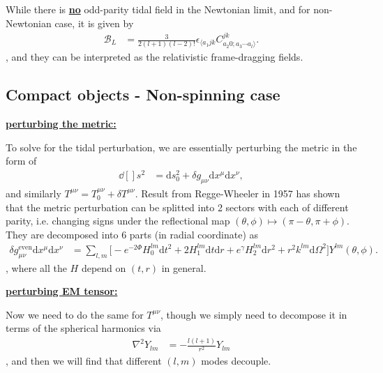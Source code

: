 \documentclass[a4paper, 12pt]{article}
\begin{document}
      While there is \underline{\textbf{no}} odd-parity tidal field
      in the Newtonian limit, and for non-Newtonian case, it is given by 
      \begin{align}
        \label{odd parity tidal}
        \mathcal{B}_L &= \frac{3}{2(l+1)(l-2)!} \epsilon_{\langle
        a_1 j k} C_{a_2 0; a_3\cdots a_l \rangle }^{jk}.
      \end{align}, and they can be interpreted as the relativistic
      frame-dragging fields.
      \subsection{Compact objects - Non-spinning case}%
        \label{sub:Compact objects - Non-spinning case}
       
\textbf{\underline{perturbing the metric: }}

       To solve for the tidal perturbation, we are essentially
       perturbing the metric in the form of 
       \begin{align}
        \label{tidal metric perturbation}
        \dd[]{s}^{2} &= \mathrm{d}s_{0}^{2} + \delta g_{\mu \nu}
         \mathrm{d}x^{\mu}\mathrm{d}x^{\nu},  
       \end{align}
       and similarly \( T^{\mu \nu}  = T_{0}^{\mu \nu} + \delta T^{\mu
       \nu}  \).
       Result from Regge-Wheeler in 1957 has shown that the metric
       perturbation can be splitted into 2 sectors with each of
       different parity, i.e. changing signs under the
       reflectional map \( (\theta, \phi) \mapsto (\pi - \theta, \pi +
       \phi) \). They are decomposed into 6 parts (in radial
       coordinate) as 
       \begin{align}
        \label{decomposing tidal metric perturbation}
        \delta g_{\mu \nu}^{\mathrm{even}} \mathrm{d}x^{\mu}
         \mathrm{d}x^{\nu} &=  \sum_{l,m} \bigg[- e^{-2\Phi}
         H_{0}^{lm}\mathrm{d}t^2 + 2 H_{1}^{lm} \mathrm{d}t
         \mathrm{d}r + e^{\gamma} H_{2}^{lm} \mathrm{d}r^2 + r^2
         k^{lm} \mathrm{d}\Omega^2 \bigg] Y^{lm}(\theta, \phi). 
       \end{align}, where all the \( H \) depend on \( (t, r) \) in
       general.
       
\textbf{\underline{perturbing EM tensor:}}

  Now we need to do the same for \( T^{\mu \nu}  \), though we simply need
  to decompose it in terms of the spherical harmonics via 
  \begin{align}
    \label{spherical conversion on EM tensor}
    \nabla^2 Y_{lm} &= - \frac{l(l+1)}{r^2} Y_{lm} 
  \end{align}, and then we will find that different \( (l,m) \) modes
  decouple.
\end{document}
